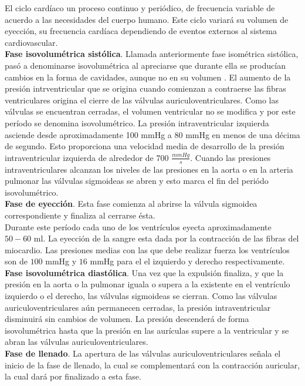 El ciclo cardíaco un proceso continuo y periódico, de frecuencia variable de acuerdo a las necesidades del cuerpo
humano. Este ciclo variará su volumen de eyección, su frecuencia cardíaca dependiendo de eventos externos al sistema
cardiovascular. \\
\indent \textbf{Fase isovolumétrica sistólica}. Llamada anteriormente fase isométrica sistólica, pasó a denominarse
isovolumétrica al apreciarse que durante ella se producían cambios en la forma de cavidades, aunque no en su volumen
. El aumento de la presión intrventricular que se origina cuando comienzan a contraerse las fibras ventriculares
origina el cierre de las válvulas auriculoventriculares. Como las válvulas se encuentran cerradas, el volumen
ventricular no se modifica y por este período se denomina isovolumétrico. La presión intraventricular izquierda
asciende desde aproximadamente 100 mmHg a 80 mmHg en menos de una décima de segundo. Esto proporciona una velocidad
media de desarrollo de la presión intraventricular izquierda de alrededor de 700 $\frac{mmHg}{s}$. Cuando las
presiones intraventriculares alcanzan los niveles de las presiones en la aorta o en la arteria pulmonar las válvulas
sigmoideas se abren y esto marca el fin del periódo isovolumétrico. \\
\indent \textbf{Fase de eyección}. Esta fase comienza al abrirse la válvula sigmoidea correspondiente y finaliza al
cerrarse ésta. \\
\indent Durante este período cada uno de los ventrículos eyecta aproximadamente $50-60$ ml. La eyección de la sangre
esta dada por la contracción de las fibras del miocardio. Las presiones medias con las que debe realizar fuerza los
ventrículos son de $100$ mmHg y $16$ mmHg para el el izquierdo y derecho respectivamente. \\
\indent \textbf{Fase isovolumétrica diastólica}. Una vez que la expulsión finaliza, y que la presión en la aorta o
la pulmonar iguala o supera a la existente en el ventrículo izquierdo o el derecho, las válvulas sigmoideas se
cierran. Como las válvulas auriculoventriculares aún permanecen cerradas, la presión intraventricular disminuirá sin
cambios de volumen. La presión descenderá de forma isovolumétrica hasta que la presión en las aurículas supere a la
ventricular y se abran las válvulas auriculoventriculares. \\
\indent \textbf{Fase de llenado}. La apertura de las válvulas auriculoventriculares señala el inicio de la fase de
llenado, la cual se complementará con la contracción auricular, la cual dará por finalizado a esta fase.
    
